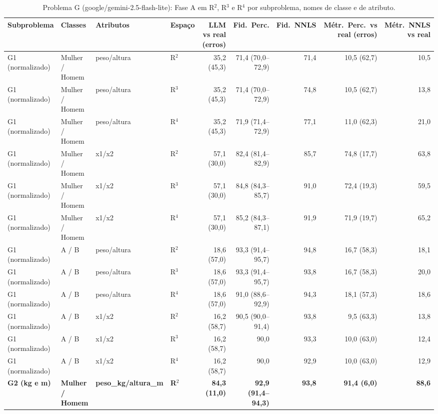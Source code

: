\begin{table}[htbp]
\centering
\footnotesize
\caption{Problema G (google/gemini-2.5-flash-lite): Fase A em R$^2$, R$^3$ e R$^4$ por subproblema, nomes de classe e de atributo.}
\label{tab:bloco3_G_faseA_R2_R3_R4_flashlite}
\begin{tabular}{llllrrrrr}
\toprule
Subproblema & Classes & Atributos & Espaço & LLM vs real (erros) & Fid.\ Perc. & Fid.\ NNLS & Métr.\ Perc.\ vs real (erros) & Métr.\ NNLS vs real \\
\midrule
G1 (normalizado) & Mulher / Homem & peso/altura & R$^2$ & 35,2 (45,3) & 71,4 (70,0–72,9) & 71,4 & 10,5 (62,7) & 10,5 \\
G1 (normalizado) & Mulher / Homem & peso/altura & R$^3$ & 35,2 (45,3) & 71,4 (70,0–72,9) & 74,8 & 10,5 (62,7) & 13,8 \\
G1 (normalizado) & Mulher / Homem & peso/altura & R$^4$ & 35,2 (45,3) & 71,9 (71,4–72,9) & 77,1 & 11,0 (62,3) & 21,0 \\
\midrule
G1 (normalizado) & Mulher / Homem & x1/x2 & R$^2$ & 57,1 (30,0) & 82,4 (81,4–82,9) & 85,7 & 74,8 (17,7) & 63,8 \\
G1 (normalizado) & Mulher / Homem & x1/x2 & R$^3$ & 57,1 (30,0) & 84,8 (84,3–85,7) & 91,0 & 72,4 (19,3) & 59,5 \\
G1 (normalizado) & Mulher / Homem & x1/x2 & R$^4$ & 57,1 (30,0) & 85,2 (84,3–87,1) & 91,9 & 71,9 (19,7) & 65,2 \\
\midrule
G1 (normalizado) & A / B & peso/altura & R$^2$ & 18,6 (57,0) & 93,3 (91,4–95,7) & 94,8 & 16,7 (58,3) & 18,1 \\
G1 (normalizado) & A / B & peso/altura & R$^3$ & 18,6 (57,0) & 93,3 (91,4–95,7) & 93,8 & 16,7 (58,3) & 20,0 \\
G1 (normalizado) & A / B & peso/altura & R$^4$ & 18,6 (57,0) & 91,0 (88,6–92,9) & 94,3 & 18,1 (57,3) & 18,6 \\
\midrule
G1 (normalizado) & A / B & x1/x2 & R$^2$ & 16,2 (58,7) & 90,5 (90,0–91,4) & 93,8 & 9,5 (63,3) & 13,8 \\
G1 (normalizado) & A / B & x1/x2 & R$^3$ & 16,2 (58,7) & 90,0 & 93,3 & 10,0 (63,0) & 12,4 \\
G1 (normalizado) & A / B & x1/x2 & R$^4$ & 16,2 (58,7) & 90,0 & 92,9 & 10,0 (63,0) & 12,9 \\
\midrule
\textbf{G2 (kg e m)} & \textbf{Mulher / Homem} & \textbf{peso\_kg/altura\_m} & \textbf{R$^2$} & \textbf{84,3 (11,0)} & \textbf{92,9 (91,4–94,3)} & \textbf{93,8} & \textbf{91,4 (6,0)} & \textbf{88,6} \\

\end{tabular}
\end{table}
